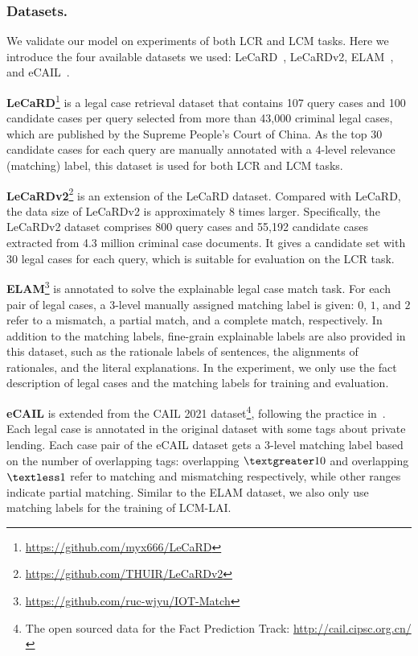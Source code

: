 \subsubsection{Datasets.} We validate our model on experiments of both LCR and LCM tasks. Here we introduce the four available datasets we used:
LeCaRD~\cite{ma2021LeCaRD}, LeCaRDv2, ELAM~\cite{yu2022Explainable}, and eCAIL~\cite{yu2022Explainable}.

\textbf{LeCaRD}\footnote{\url{https://github.com/myx666/LeCaRD}} is a legal case retrieval dataset that contains 107 query cases and 100 candidate cases per query selected from more than 43,000 criminal legal cases, which are published by the Supreme People’s Court of China.
As the top 30 candidate cases for each query are manually annotated with a $4$-level relevance (matching) label, this dataset is used for both LCR and LCM tasks.

\textbf{LeCaRDv2}\footnote{\url{https://github.com/THUIR/LeCaRDv2}} is an extension of the LeCaRD dataset.
Compared with LeCaRD, the data size of LeCaRDv2 is approximately $8$ times larger. 
Specifically, the LeCaRDv2 dataset comprises 800 query cases and 55,192 candidate cases extracted from 4.3 million criminal case documents. 
It gives a candidate set with $30$ legal cases for each query, which is suitable for evaluation on the LCR task.

\textbf{ELAM}\footnote{\url{https://github.com/ruc-wjyu/IOT-Match}} is annotated to solve the explainable legal case match task.
For each pair of legal cases, a $3$-level manually assigned matching label is given: $0$, $1$, and $2$ refer to a mismatch, a partial match, and a complete match, respectively.
In addition to the matching labels, fine-grain explainable labels are also provided in this dataset, such as the rationale labels of sentences, the alignments of rationales, and the literal explanations.
In the experiment, we only use the fact description of legal cases and the matching labels for training and evaluation.

\textbf{eCAIL} is extended from the CAIL 2021 dataset\footnote{The open sourced data for the Fact Prediction Track: \url{http://cail.cipsc.org.cn/}}, following the practice in~\cite{yu2022Explainable}. 
Each legal case is annotated in the original dataset with some tags about private lending.
Each case pair of the eCAIL dataset gets a $3$-level matching label based on the number of overlapping tags: overlapping $\textgreater 10$ and overlapping $\textless 1$ refer to matching and mismatching respectively, while other ranges indicate partial matching.
Similar to the ELAM dataset, we also only use matching labels for the training of LCM-LAI.

